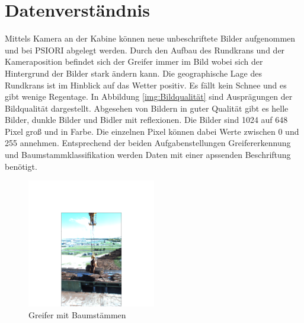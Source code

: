 	\section{Datenverständnis}
	\label{sec:DataUnderstanding}
	Mittels Kamera an der Kabine können neue unbeschriftete Bilder aufgenommen und bei PSIORI abgelegt werden. Durch den Aufbau des Rundkrans und der Kameraposition befindet sich der Greifer immer im Bild wobei sich der Hintergrund der Bilder stark ändern kann. Die geographische Lage des Rundkrans ist im Hinblick auf das Wetter positiv. Es fällt kein Schnee und es gibt wenige Regentage. In Abbildung  \ref{img:Bildqualität} sind Ausprägungen der  Bildqualität dargestellt. Abgesehen von Bildern in guter Qualität gibt es helle Bilder, dunkle Bilder und Bidler mit reflexionen. Die Bilder sind 1024 auf 648 Pixel groß und in Farbe. Die einzelnen Pixel können dabei Werte zwischen 0 und 255 annehmen. 
	Entsprechend der beiden Aufgabenstellungen Greifererkennung und Baumstammklassifikation werden Daten mit einer apssenden Beschriftung benötigt.
		\begin{figure}
		\centering
		\includegraphics[width=0.5\textwidth, center]{bilder/Grundlagen/Logs_14.png}
		\caption[Bsp. Bild: Greifer mit Baumstämmen]{Greifer mit Baumstämmen}
		\label{img:Logs}
	\end{figure}
	
